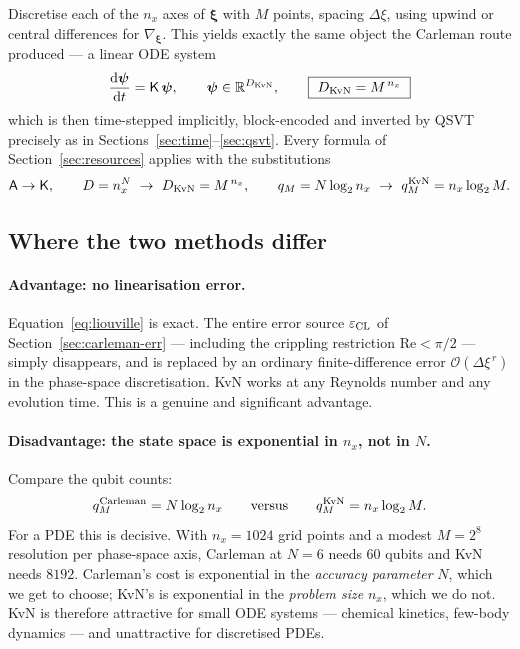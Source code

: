 \documentclass[11pt,a4paper]{article}
\theoremstyle{plain}
\theoremstyle{definition}
\theoremstyle{remark}
\newcommand{\R}{\mathbb{R}}
\newcommand{\Rey}{\mathrm{Re}}
\newcommand{\Oh}{\mathcal{O}}
\newcommand{\dd}{\mathrm{d}}
\newcommand{\Amat}{\mathsf{A}}
\begin{document}
Discretise each of the $n_x$ axes of $\bm\xi$ with $M$ points, spacing
$\Delta\xi$, using upwind or central differences for $\nabla_{\bm\xi}$.  This
yields exactly the same object the Carleman route produced --- a linear ODE
system
\begin{equation}
\frac{\dd\bm\psi}{\dd t}=\mathsf{K}\,\bm\psi,
\qquad \bm\psi\in\R^{D_{\rm KvN}},
\qquad
\boxed{\ D_{\rm KvN}=M^{\,n_x}\ }
\end{equation}
which is then time-stepped implicitly, block-encoded and inverted by QSVT
precisely as in Sections~\ref{sec:time}--\ref{sec:qsvt}.  Every formula of
Section~\ref{sec:resources} applies with the substitutions
\begin{equation}
\Amat\to\mathsf{K},\qquad
D=n_x^{N}\ \to\ D_{\rm KvN}=M^{\,n_x},\qquad
q_M=N\log_2 n_x\ \to\ q_M^{\rm KvN}=n_x\log_2 M .
\label{eq:kvnsub}
\end{equation}

\subsection{Where the two methods differ}

\paragraph{Advantage: no linearisation error.}  Equation~\eqref{eq:liouville} is
exact.  The entire error source $\varepsilon_{\rm CL}$ of
Section~\ref{sec:carleman-err} --- including the crippling restriction
$\Rey<\pi/2$ --- simply disappears, and is replaced by an ordinary
finite-difference error $\Oh(\Delta\xi^{\,r})$ in the phase-space discretisation.
KvN works at any Reynolds number and any evolution time.  This is a genuine and
significant advantage.

\paragraph{Disadvantage: the state space is exponential in $n_x$, not in $N$.}
Compare the qubit counts:
\begin{equation}
q_M^{\rm Carleman}=N\log_2 n_x
\qquad\text{versus}\qquad
q_M^{\rm KvN}=n_x\log_2 M .
\end{equation}
For a PDE this is decisive.  With $n_x=1024$ grid points and a modest $M=2^{8}$
resolution per phase-space axis, Carleman at $N=6$ needs $60$ qubits and KvN
needs $8192$.  Carleman's cost is exponential in the \emph{accuracy parameter}
$N$, which we get to choose; KvN's is exponential in the \emph{problem size}
$n_x$, which we do not.  KvN is therefore attractive for small ODE systems ---
chemical kinetics, few-body dynamics --- and unattractive for discretised PDEs.
\end{document}
